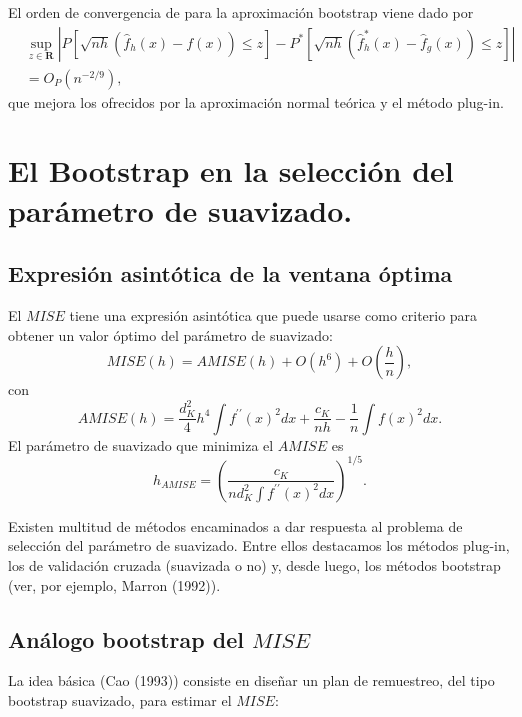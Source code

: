 \documentclass[]{book}
\theoremstyle{definition}
\theoremstyle{definition}
\theoremstyle{definition}
\theoremstyle{remark}
\begin{document}
El orden de convergencia de para la aproximación bootstrap viene dado
por \[\begin{aligned}
&\sup_{z\in \boldsymbol{R}}\left\vert P\left[ \sqrt{nh}\left( \hat{f}
_{h}\left( x \right) -f\left( x \right) \right) \leq z\right] -P^{\ast}\left[ 
\sqrt{nh}\left( \hat{f}_{h}^{\ast}\left( x \right) -\hat{f}_{g}\left(
x \right) \right) \leq z\right] \right\vert \\
&= O_{P}\left( n^{-2/9} \right),\end{aligned}\]que mejora los ofrecidos
por la aproximación normal teórica y el método plug-in.

\section{El Bootstrap en la selección del parámetro de
suavizado.}\label{el-bootstrap-en-la-seleccion-del-parametro-de-suavizado.}

\subsection{Expresión asintótica de la ventana
óptima}\label{expresion-asintotica-de-la-ventana-optima}

El \(MISE\) tiene una expresión asintótica que puede usarse como
criterio para obtener un valor óptimo del parámetro de
suavizado:\[MISE\left( h \right) =AMISE\left( h \right) +O\left( h^{6} \right) +O\left( 
\frac{h}{n} \right),\]con\[AMISE\left( h \right) =\frac{d_{K}^2}{4}h^{4}\int f^{\prime \prime }\left(
x \right)^2dx+\frac{c_{K}}{nh}-\frac{1}{n}\int f\left( x \right)^2dx.\]El
parámetro de suavizado que minimiza el \(AMISE\)
es\[h_{AMISE}=\left( \frac{c_{K}}{nd_{K}^2\int f^{\prime \prime }\left(
x \right)^2dx} \right)^{1/5}.\]

Existen multitud de métodos encaminados a dar respuesta al problema de
selección del parámetro de suavizado. Entre ellos destacamos los métodos
plug-in, los de validación cruzada (suavizada o no) y, desde luego, los
métodos bootstrap (ver, por ejemplo, Marron (1992)).

\subsection{\texorpdfstring{Análogo bootstrap del
\(MISE\)}{Análogo bootstrap del MISE}}\label{analogo-bootstrap-del-mise}

La idea básica (Cao (1993)) consiste en diseñar un plan de remuestreo,
del tipo bootstrap suavizado, para estimar el \(MISE\):
\end{document}
